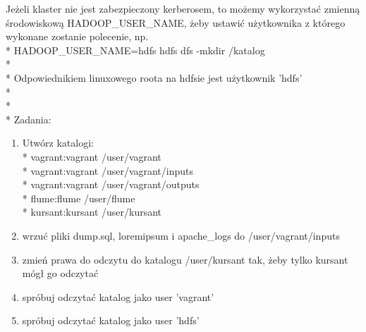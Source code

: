 \documentclass[11pt]{article}
\begin{document}
Jeżeli klaster nie jest zabezpieczony kerberosem, to możemy wykorzystać zmienną środowiskową HADOOP\_USER\_NAME, żeby ustawić użytkownika z którego wykonane zostanie polecenie, np.
\\*
HADOOP\_USER\_NAME=hdfs hdfs dfs -mkdir /katalog
\\*
\\*
Odpowiednikiem linuxowego roota na hdfsie jest użytkownik 'hdfs'
\\*
\\*
\\*
Zadania:
\begin{enumerate}
\item Utwórz katalogi:\\*
vagrant:vagrant /user/vagrant
\\*
vagrant:vagrant /user/vagrant/inputs
\\*
vagrant:vagrant /user/vagrant/outputs
\\*
flume:flume /user/flume
\\*
kursant:kursant /user/kursant
\item wrzuć pliki dump.sql, loremipsum i apache\_logs do /user/vagrant/inputs
\item zmień prawa do odczytu do katalogu /user/kursant tak, żeby tylko kursant mógł go odczytać
\item spróbuj odczytać katalog jako user ’vagrant’
\item spróbuj odczytać katalog jako user ’hdfs’
\end{enumerate}
\end{document}

